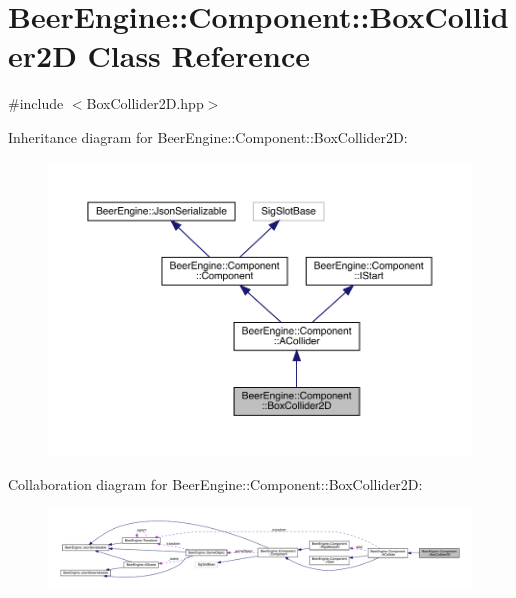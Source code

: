 \hypertarget{class_beer_engine_1_1_component_1_1_box_collider2_d}{}\section{Beer\+Engine\+:\+:Component\+:\+:Box\+Collider2D Class Reference}
\label{class_beer_engine_1_1_component_1_1_box_collider2_d}


{\ttfamily \#include $<$Box\+Collider2\+D.\+hpp$>$}



Inheritance diagram for Beer\+Engine\+:\+:Component\+:\+:Box\+Collider2D\+:
\nopagebreak
\begin{figure}[H]
\begin{center}
\leavevmode
\includegraphics[width=350pt]{class_beer_engine_1_1_component_1_1_box_collider2_d__inherit__graph}
\end{center}
\end{figure}


Collaboration diagram for Beer\+Engine\+:\+:Component\+:\+:Box\+Collider2D\+:
\nopagebreak
\begin{figure}[H]
\begin{center}
\leavevmode
\includegraphics[width=350pt]{class_beer_engine_1_1_component_1_1_box_collider2_d__coll__graph}
\end{center}
\end{figure}
